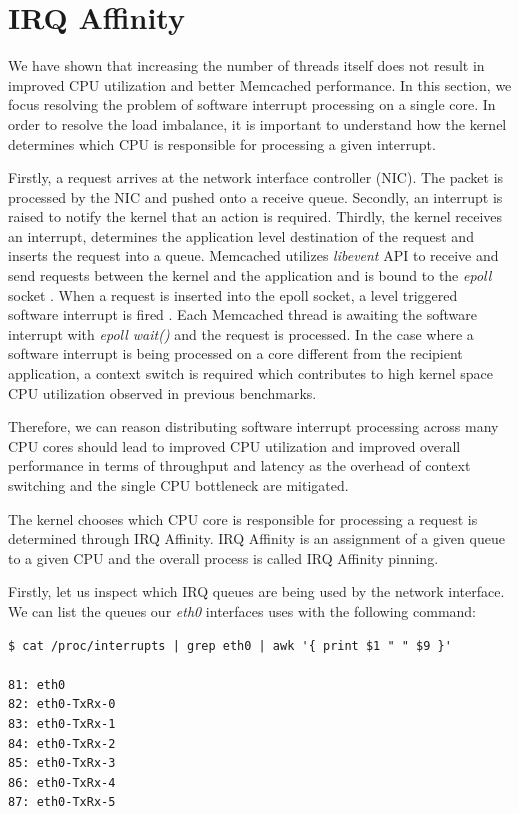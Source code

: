 \section{IRQ Affinity}
We have shown that increasing the number of threads itself does not result in improved CPU utilization and better Memcached performance. In this section, we focus resolving the problem of software interrupt processing on a single core. In order to resolve the load imbalance, it is important to understand how the kernel determines which CPU is responsible for processing a given interrupt.

Firstly, a request arrives at the network interface controller (NIC). The packet is processed by the NIC and pushed onto a receive queue. Secondly, an interrupt is raised to notify the kernel that an action is required. Thirdly, the kernel receives an interrupt, determines the application level destination of the request and inserts the request into a queue. Memcached utilizes \textit{libevent} API to receive and send requests between the kernel and the application and is bound to the \textit{epoll} socket \cite{zhang2014efficient}. When a request is inserted into the epoll socket, a level triggered software interrupt is fired \cite{blacklibtorque}. Each Memcached thread is awaiting the software interrupt with \textit{epoll wait()} \cite{thongprasit2015toward} and the request is processed. In the case where a software interrupt is being processed on a core different from the recipient application, a context switch is required which contributes to high kernel space CPU utilization observed in previous benchmarks.

Therefore, we can reason distributing software interrupt processing across many CPU cores should lead to improved CPU utilization and improved overall performance in terms of throughput and latency as the overhead of context switching and the single CPU bottleneck are mitigated.

The kernel chooses which CPU core is responsible for processing a request is determined through IRQ Affinity. IRQ Affinity is an assignment of a given queue to a given CPU and the overall process is called IRQ Affinity pinning.

Firstly, let us inspect which IRQ queues are being used by the network interface. We can list the queues our \textit{eth0} interfaces uses with the following command:
\begin{lstlisting}
$ cat /proc/interrupts | grep eth0 | awk '{ print $1 " " $9 }'

81: eth0
82: eth0-TxRx-0
83: eth0-TxRx-1
84: eth0-TxRx-2
85: eth0-TxRx-3
86: eth0-TxRx-4
87: eth0-TxRx-5
\end{lstlisting}

